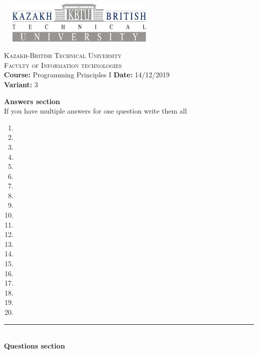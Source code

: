 \documentclass[10pt]{article}
\begin{document}
\begin{center}
\includegraphics[width=8cm, height=2cm]{kbtu.jpg}
\end{center}

\begin{center}
	\begin{minipage}{11.4cm}
		\begin{center}
				{\small \textsc{Kazakh-British Technical University}			\\
						  \textsc{Faculty of Information technologies} \\
                         \textbf{Course:} Programming Principles I \hspace{.65cm}
                         \textbf{Date:} 14/12/2019\\\textbf{Variant:} 3\\
                }
		\end{center}
	\end{minipage}
\end{center}
\textbf{
{Answers section}\\
}
{If you have multiple answers for one question write them all}
\begin{multicols}{5}
\begin{enumerate}
\item \item \item \item \item \item \item \item \item \item \item \item \item \item \item \item \item \item \item \item
\end{enumerate}
\end{multicols}
\medskip\hrule
\textbf{
\\
{Questions section}\\
}
\end{document}
